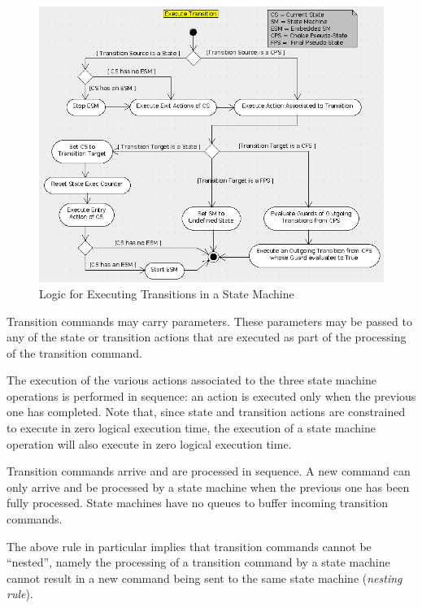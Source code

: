 \documentclass[a4paper,10pt]{article}
\begin{document}
\begin{figure}[ht]
 \centering
 \includegraphics[scale=0.45,keepaspectratio=true]{../images/SM_TransitionExecution.png}
 \caption{Logic for Executing Transitions in a State Machine}
 \label{fig:SmTransitionExecution}
\end{figure}

Transition commands may carry parameters. These parameters may be passed to any of the
state or transition actions that are executed as part of the processing of the transition command.

The execution of the various actions associated to the three state machine operations is performed in sequence: an action is executed only when the previous one has completed. Note that, since state and transition actions are constrained to execute in zero logical execution time, the execution of a state machine operation will also execute in zero logical execution time.

Transition commands arrive and are processed in sequence. A new command can only arrive
and be processed by a state machine when the previous one has been fully processed. State
machines have no queues to buffer incoming transition commands.

The above rule in particular implies that transition commands cannot be “nested”, namely the
processing of a transition command by a state machine cannot result in a new command being
sent to the same state machine (\emph{nesting rule}).
\end{document}

